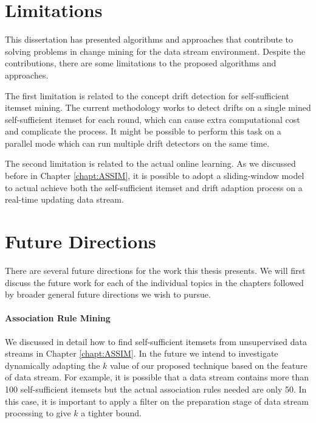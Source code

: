\section{Limitations} \label{Conclusion:Limitations}

This dissertation has presented algorithms and approaches that contribute to solving problems in change mining for the data stream environment. Despite the contributions, there are some limitations to the proposed algorithms and approaches.

The first limitation is related to the concept drift detection for self-sufficient itemset mining. The current methodology works to detect drifts on a single mined self-sufficient itemset for each round, which can cause extra computational cost and complicate the process. It might be possible to perform this task on a parallel mode which can run multiple drift detectors on the same time.

The second limitation is related to the actual online learning. As we discussed before in Chapter \ref{chapt:ASSIM}, it is possible to adopt a sliding-window model to actual achieve both the self-sufficient itemset and drift adaption process on a real-time updating data stream.

\section{Future Directions} \label{Conclusion:FutureDirections}

There are several future directions for the work this thesis presents. We will first discuss the future work for each of the individual topics in the chapters followed by broader general future directions we wish to pursue.

\paragraph{Association Rule Mining}

We discussed in detail how to find self-sufficient itemsets from unsupervised data streams in Chapter \ref{chapt:ASSIM}. In the future we intend to investigate dynamically adapting the $k$ value of our proposed technique based on the feature of data stream. For example, it is possible that a data stream contains more than 100 self-sufficient itemsets but the actual association rules needed are only 50. In this case, it is important to apply a filter on the preparation stage of data stream processing to give $k$ a tighter bound.

